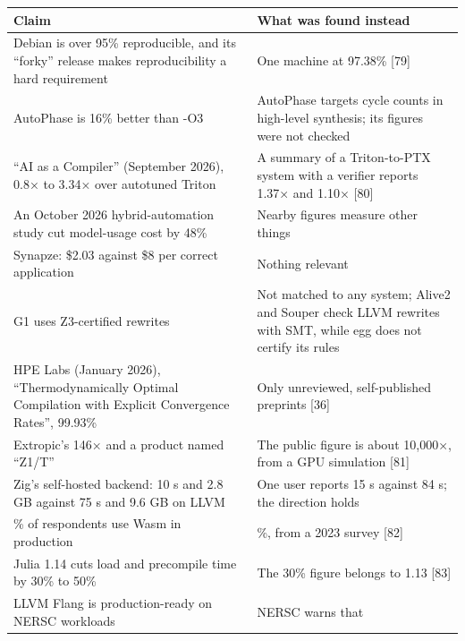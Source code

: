 \documentclass[10pt,letterpaper]{article}
\begin{document}
{\footnotesize\setlength{\tabcolsep}{3.8pt}\renewcommand{\arraystretch}{1.15}
\begin{longtable}[]{@{}
  >{\raggedright\arraybackslash}p{}
  >{\raggedright\arraybackslash}p{}@{}}
\toprule\noalign{}
\begin{minipage}[b]{\linewidth}\raggedright
\textbf{Claim}
\end{minipage} & \begin{minipage}[b]{\linewidth}\raggedright
\textbf{What was found instead}
\end{minipage} \\
\midrule\noalign{}
\endhead
\bottomrule\noalign{}
\endlastfoot
Debian is over 95\% reproducible, and its ``forky'' release makes
reproducibility a hard requirement & One machine at 97.38\% {[}79{]} \\
AutoPhase is 16\% better than -O3 & AutoPhase targets cycle counts in
high-level synthesis; its figures were not checked \\
``AI as a Compiler'' (September 2026), 0.8× to 3.34× over autotuned
Triton & A summary of a Triton-to-PTX system with a verifier reports
1.37× and 1.10× {[}80{]} \\
An October 2026 hybrid-automation study cut model-usage cost by 48\% &
Nearby figures measure other things \\
Synapze: \$2.03 against \$8 per correct application & Nothing
relevant \\
G1 uses Z3-certified rewrites & Not matched to any system; Alive2 and
Souper check LLVM rewrites with SMT, while egg does not certify its
rules \\
HPE Labs (January 2026), ``Thermodynamically Optimal Compilation with
Explicit Convergence Rates'', 99.93\% & Only unreviewed, self-published
preprints {[}36{]} \\
Extropic's 146× and a product named ``Z1/T'' & The public figure is
about 10,000×, from a GPU simulation {[}81{]} \\
Zig's self-hosted backend: 10 s and 2.8 GB against 75 s and 9.6 GB on
LLVM & One user reports 15 s against 84 s; the direction holds \\
67\% of respondents use Wasm in production & 41\%, from a 2023 survey
{[}82{]} \\
Julia 1.14 cuts load and precompile time by 30\% to 50\% & The 30\%
figure belongs to 1.13 {[}83{]} \\
LLVM Flang is production-ready on NERSC workloads & NERSC warns that

\end{longtable}}
\end{document}
